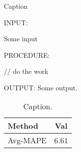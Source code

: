 \documentclass[letterpaper]{article}
\theoremstyle{definition}
\theoremstyle{theorem}
\theoremstyle{corollary}
\begin{document}
\begin{algorithm}
\small \caption{Caption}
\label{alg:summary}
{INPUT:}
\begin{compactitem}
\item Some input
\end{compactitem}
{PROCEDURE:}
\begin{algorithmic}[1]
   \STATE // do the work
\end{algorithmic}
{OUTPUT:}
  Some output.
\renewcommand*\arraystretch{1.0}
\end{algorithm}

\begin{table}[!hptb]
\caption{Caption.}
\centering
\begin{tabular}{@{}lc@{}} \toprule
\label{tab:mape}
Method & Val  \\ \midrule 
Avg-MAPE & 6.61 \\   \bottomrule
\end{tabular}
\end{table}




\end{document}
